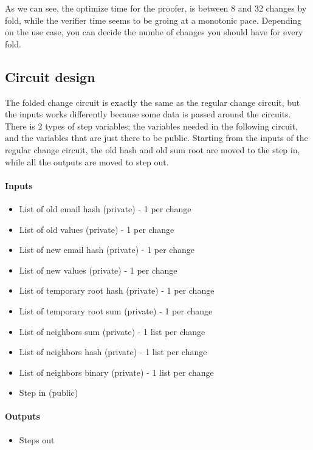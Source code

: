 As we can see, the optimize time for the proofer, is between 8 and 32 changes by fold, while the verifier time seems to be groing at a monotonic pace.
Depending on the use case, you can decide the numbe of changes you should have for every fold. 

\subsection{Circuit design}
The folded change circuit is exactly the same as the regular change circuit, but the inputs works differently because some data is passed around the circuits.
There is 2 types of step variables; the variables needed in the following circuit, and the variables that are just there to be public. 
Starting from the inputs of the regular change circuit, the old hash and old sum root are moved to the step in, while all the outputs are moved to step out.

\paragraph{Inputs}
\begin{itemize}
   \item List of old email hash (private) - 1 per change
   \item List of old values (private) - 1 per change
   \item List of new email hash (private) - 1 per change
   \item List of new values (private) - 1 per change
   \item List of temporary root hash (private) - 1 per change
   \item List of temporary root sum (private) - 1 per change
   \item List of neighbors sum (private) - 1 list per change
   \item List of neighbors hash (private) - 1 list per change
   \item List of neighbors binary (private) - 1 list per change
   \item Step in (public)
   \end{itemize}

\paragraph{Outputs}
\begin{itemize}
   \item Steps out
   \end{itemize}

